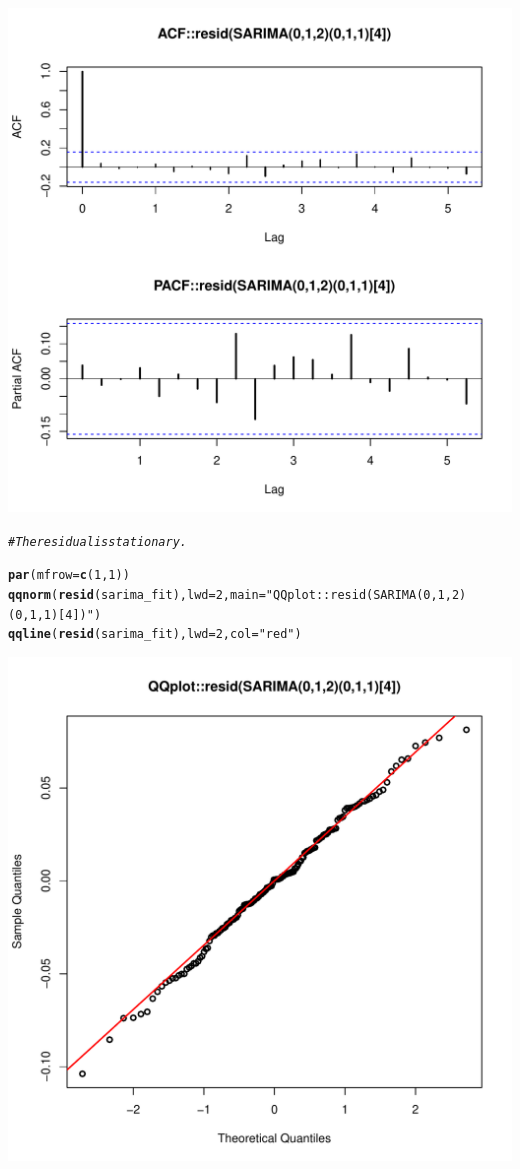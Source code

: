 \documentclass[10pt]{article}\usepackage[]{graphicx}\usepackage[]{color}
\makeatletter
\def\maxwidth{ %
  \ifdim\Gin@nat@width>\linewidth
    \linewidth
  \else
    \Gin@nat@width
  \fi
}
\newcommand{\hlnum}[1]{\textcolor[rgb]{0.686,0.059,0.569}{#1}}%
\newcommand{\hlstr}[1]{\textcolor[rgb]{0.192,0.494,0.8}{#1}}%
\newcommand{\hlcom}[1]{\textcolor[rgb]{0.678,0.584,0.686}{\textit{#1}}}%
\newcommand{\hlstd}[1]{\textcolor[rgb]{0.345,0.345,0.345}{#1}}%
\newcommand{\hlkwc}[1]{\textcolor[rgb]{0.333,0.667,0.333}{#1}}%
\newcommand{\hlkwd}[1]{\textcolor[rgb]{0.737,0.353,0.396}{\textbf{#1}}}%
\newenvironment{kframe}{%
 \def\at@end@of@kframe{}%
 \ifinner\ifhmode%
  \def\at@end@of@kframe{\end{minipage}}%
  \begin{minipage}{\columnwidth}%
 \fi\fi%
 \def\FrameCommand##1{\hskip\@totalleftmargin \hskip-\fboxsep
 \colorbox{shadecolor}{##1}\hskip-\fboxsep
     \hskip-\linewidth \hskip-\@totalleftmargin \hskip\columnwidth}%
 \MakeFramed {\advance\hsize-\width
   \@totalleftmargin\z@ \linewidth\hsize
   \@setminipage}}%
 {\par\unskip\endMakeFramed%
 \at@end@of@kframe}
\newenvironment{knitrout}{}{} %
\makeatother
\begin{document}
\begin{knitrout}
\includegraphics[width=\maxwidth]{figure/unnamed-chunk-20-2} 
\begin{kframe}\begin{alltt}
\hlcom{#The residual is stationary.}

\hlkwd{par}\hlstd{(}\hlkwc{mfrow}\hlstd{=}\hlkwd{c}\hlstd{(}\hlnum{1}\hlstd{,}\hlnum{1}\hlstd{))}
\hlkwd{qqnorm}\hlstd{(}\hlkwd{resid}\hlstd{(sarima_fit),}\hlkwc{lwd}\hlstd{=}\hlnum{2}\hlstd{,} \hlkwc{main}\hlstd{=}\hlstr{"QQplot::resid(SARIMA(0,1,2)(0,1,1)[4])"}\hlstd{)}
\hlkwd{qqline}\hlstd{(}\hlkwd{resid}\hlstd{(sarima_fit),} \hlkwc{lwd}\hlstd{=}\hlnum{2}\hlstd{,} \hlkwc{col}\hlstd{=}\hlstr{"red"}\hlstd{)}
\end{alltt}
\end{kframe}
\includegraphics[width=\maxwidth]{figure/unnamed-chunk-20-3} 

\end{knitrout}
\end{document}
